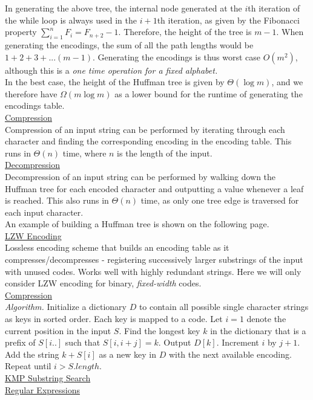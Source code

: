 \documentclass[12pt, fleqn]{general}
\begin{document}
\begin{multicols*}{2}
    In generating the above tree, the internal node generated at the $i$th iteration of the while loop is always used in the $i+1$th iteration, as given by the Fibonacci property  $\sum_{i=1}^n F_i = F_{n+2} - 1$. Therefore, the height of the tree is $m-1$. When generating the encodings, the sum of all the path lengths would be $1 + 2 + 3 + ... (m-1)$. Generating the encodings is thus worst case $O(m^2)$, although this is a \emph{one time operation for a fixed alphabet.}\\

    In the best case, the height of the Huffman tree is given by $\Theta(\log m)$, and we therefore have $\Omega(m \log m)$ as a lower bound for the runtime of generating the encodings table.\\

    \underline{Compression}\\

    Compression of an input string can be performed by iterating through each character and finding the corresponding encoding in the encoding table. This runs in $\Theta(n)$ time, where $n$ is the length of the input.\\

    \underline{Decompression}\\

    Decompression of an input string can be performed by walking down the Huffman tree for each encoded character and outputting a value whenever a leaf is reached. This also runs in $\Theta(n)$ time, as only one tree edge is traversed for each input character.\\

    An example of building a Huffman tree is shown on the following page.\\

    {\large \underline{LZW Encoding}}\\

    Lossless encoding scheme that builds an encoding table as it compresses/decompresses - registering successively larger substrings of the input with unused codes. Works well with highly redundant strings. Here we will only consider LZW encoding for binary, \emph{fixed-width} codes.\\

    \underline{Compression}\\

    \emph{Algorithm.} Initialize a dictionary $D$ to contain all possible single character strings as keys in sorted order. Each key is mapped to a code. Let $i=1$ denote the current position in the input $S$. Find the longest key $k$ in the dictionary that is a prefix of $S[i..]$ such that $S[i, i+j] = k$. Output $D[k]$. Increment $i$ by $j+1$. Add the string $k + S[i]$ as a new key in $D$ with the next available encoding. Repeat until $i > S.length$.\\

    {\large \underline{KMP Substring Search}}\\
    
    {\large \underline{Regular Expressions}}\\

    \end{multicols*}
\end{document}
